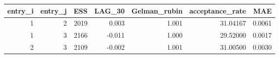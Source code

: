\begin{longtable}{rrrrrrr}
\toprule
entry\_i & entry\_j & ESS & LAG\_30 & Gelman\_rubin & acceptance\_rate & MAE \\ 
\midrule
1 & 2 & 2019 & 0.003 & 1.001 & 31.04167 & 0.0061 \\ 
1 & 3 & 2166 & -0.011 & 1.000 & 29.52000 & 0.0017 \\ 
2 & 3 & 2109 & -0.002 & 1.001 & 31.00500 & 0.0030 \\ 
\bottomrule
\end{longtable}

